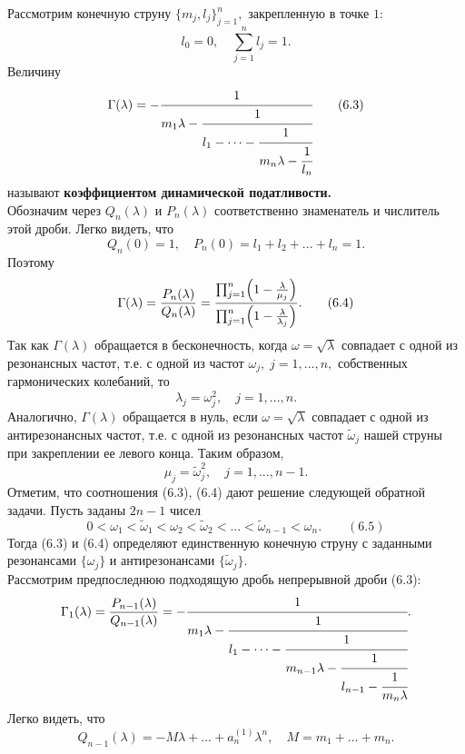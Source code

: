 \documentclass[12pt,a4paper]{article}
\theoremstyle{plain}   \newtheorem{Pro}{Задача}
\begin{document}
Рассмотрим конечную струну
$ \{ m_j ,l_j \} _{j=1}^n , $
закрепленную в точке $ 1: $
$$
  l_0 =0 , \quad
    \sum _{j=1}^n l_j =1.
$$
Величину
\begin{equation*}
  \Gamma (\lambda )=-
    \cfrac{1}{m_1 \lambda -
	  \cfrac{1}{l_1 -\dotsb -
	    \cfrac{1}{m_n \lambda -
		  \cfrac{1}{l_n
	}}}}
	\qquad (6.3)
\end{equation*}
называют
{\bfseries коэффициентом динамической податливости.} \\
Обозначим через
$ Q_n (\lambda ) $
и
$ P_n (\lambda ) $
соответственно знаменатель и числитель этой дроби.
Легко видеть, что
$$
  Q_n (0)=1,
    \quad P_n (0)=l_1 +l_2 +...+l_n =1.
$$
Поэтому
\begin{equation*}
  \Gamma (\lambda )=
    \frac{P_n (\lambda )}{Q_n (\lambda )}=
	  \frac{\prod _{j=1}^n \Bigl ( 1-
	    \frac{\lambda}{\mu _j} \Bigr ) }
	  {\prod _{j=1}^n \Bigl ( 1-
	    \frac{\lambda}{\lambda _j} \Bigr ) }.
   \qquad (6.4)
\end{equation*}
Так как
$ \Gamma (\lambda ) $
обращается в бесконечность, когда
$ \omega = \sqrt{\lambda} $
совпадает с одной из резонансных частот, т.е.
с одной из частот
$ \omega _j , \; j=1,...,n, $
собственных гармонических колебаний, то
$$
  \lambda _j =\omega _j ^2 , \quad j=1,...,n.
$$
Аналогично,
$ \Gamma (\lambda ) $
обращается в нуль, если
$ \omega =\sqrt{\lambda} $
совпадает с одной из антирезонансных частот,
т.е. с одной из резонансных частот
$ \tilde \omega _j $
нашей струны при закреплении ее левого конца.
Таким образом,
$$
  \mu _j =\tilde \omega _j ^2 ,
    \quad j=1,...,n-1.
$$
Отметим, что соотношения (6.3), (6.4) дают решение следующей
обратной задачи.
Пусть заданы
$ 2n-1 $
чисел
$$
  0<\omega _1 <\tilde \omega _1 < \omega _2 <
    \tilde \omega _2 <...<\tilde \omega _{n-1}<\omega _n .
	  \qquad (6.5)
$$
Тогда (6.3) и (6.4) определяют единственную конечную струну
с заданными резонансами
$ \{ \omega _j \} $
и антирезонансами
$ \{ \tilde \omega _j \} . $ \\
Рассмотрим предпоследнюю подходящую дробь непрерывной
дроби (6.3):
\begin{equation*}
  \Gamma _1 (\lambda )=
    \frac{P_{n-1}(\lambda )}{Q_{n-1}(\lambda )}=-
	  \cfrac{1}{m_1 \lambda -
	    \cfrac{1}{l_1 - \dotsb -
		  \cfrac{1}{m_{n-1}\lambda -
		    \cfrac{1}{l_{n-1}-
			  \cfrac{1}{m_n \lambda
	  }}}}}.
\end{equation*}
Легко видеть, что
$$
  Q_{n-1}(\lambda )=-M\lambda +...+a_n ^{(1)} \lambda ^n ,
    \quad M=m_1 +...+m_n .
$$
\end{document}
